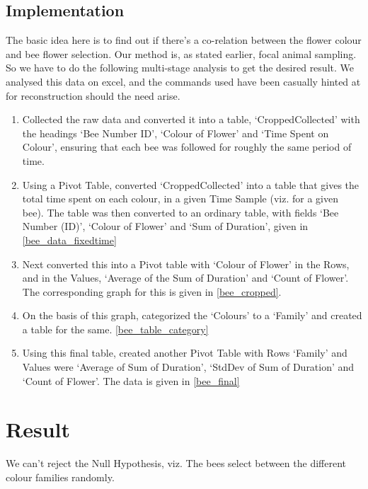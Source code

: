 	\subsection{Implementation}
		The basic idea here is to find out if there's a co-relation between the flower colour and bee flower selection. Our method is, as stated earlier, focal animal sampling. So we have to do the following multi-stage analysis to get the desired result. We analysed this data on excel, and the commands used have been casually hinted at for reconstruction should the need arise.
		\begin{enumerate}
			\item Collected the raw data and converted it into a table, `CroppedCollected' with the headings `Bee Number ID', `Colour of Flower' and `Time Spent on Colour', ensuring that each bee was followed for roughly the same period of time.
			\item Using a Pivot Table, converted `CroppedCollected' into a table that gives the total time spent on each colour, in a given Time Sample (viz. for a given bee). The table was then converted to an ordinary table, with fields `Bee Number (ID)', `Colour of Flower' and `Sum of Duration', given in \autoref{bee_data_fixedtime}
			\item Next converted this into a Pivot table with `Colour of Flower' in the Rows, and in the Values, `Average of the Sum of Duration' and `Count of Flower'. The corresponding graph for this is given in \autoref{bee_cropped}.
			\item On the basis of this graph, categorized the `Colours' to a `Family' and created a table for the same. \autoref{bee_table_category}
			\item Using this final table, created another Pivot Table with Rows `Family' and Values were `Average of Sum of Duration', `StdDev of Sum of Duration' and `Count of Flower'. The data is given in \autoref{bee_final}
		\end{enumerate}

\section{Result}
	We can't reject the Null Hypothesis, viz. The bees select between the different colour families randomly.









